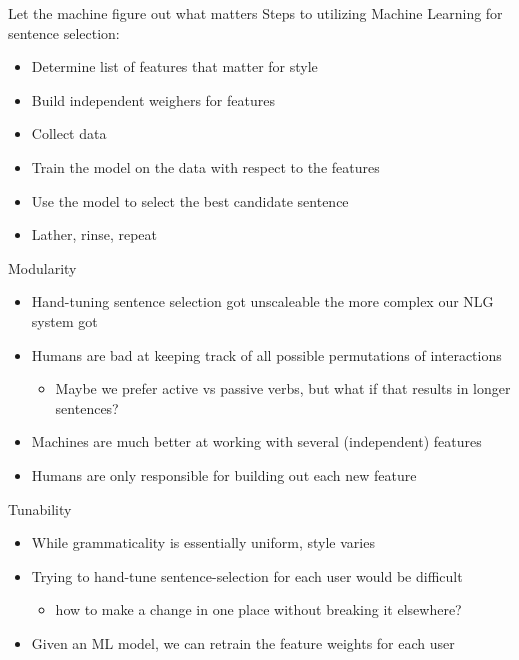 \documentclass[10pt, compress]{beamer}
\begin{document}
\begin{frame}{Let the machine figure out what matters}
	Steps to utilizing Machine Learning for sentence selection:

	\begin{itemize}
		\item Determine list of features that matter for style
		\item Build independent weighers for features
		\item Collect data
		\item Train the model on the data with respect to the features
		\item Use the model to select the best candidate sentence
		\item Lather, rinse, repeat
	\end{itemize}
\end{frame}

\begin{frame}{Modularity}
	\begin{itemize}
		\item Hand-tuning sentence selection got unscaleable the more complex our NLG system got
		\item Humans are bad at keeping track of all possible permutations of interactions \pause
		\begin{itemize}
			\item Maybe we prefer active vs passive verbs, but what if that results in longer sentences? \pause
		\end{itemize}
		\item Machines are much better at working with several (independent) features
		\item Humans are only responsible for building out each new feature
	\end{itemize}
\end{frame}

\begin{frame}{Tunability}
	\begin{itemize}
		\item While grammaticality is essentially uniform, style varies
		\item Trying to hand-tune sentence-selection for each user would be difficult	\pause
		\begin{itemize}
			\item how to make a change in one place without breaking it elsewhere?	\pause
		\end{itemize}
		\item Given an ML model, we can retrain the feature weights for each user
	\end{itemize}
\end{frame}
\end{document}
